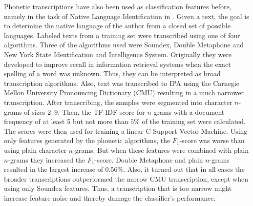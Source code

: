 Phonetic transcriptions have also been used as classification features before, namely in the task of Native Language Identification in \cite{smiley2017native}.
Given a text, the goal is to determine the native language of the author from a closed set of possible languages.
Labeled texts from a training set were transcribed using one of four algorithms.
Three of the algorithms used were Soundex, Double Metaphone and New York State Identification and Intelligence System.
Originally they were developed to improve recall in information retrieval systems when the exact spelling of a word was unknown.
Thus, they can be interpreted as broad transcription algorithms.
Also, text was transcribed to IPA using the Carnegie Mellon University Pronouncing Dictionary (CMU) resulting in a much narrower transcription.
After transcribing, the samples were segmented into character $n$-grams of sizes 2--9.
Then, the TF-IDF score for $n$-grams with a document frequency of at least 5 but not more than $5\%$ of the training set were calculated.
The scores were then used for training a linear C-Support Vector Machine.
Using only features generated by the phonetic algorithms, the $F_1$-score was worse than using plain character $n$-grams.
But when these features were combined with plain $n$-grams they increased the $F_1$-score.
Double Metaphone and plain $n$-grams resulted in the largest increase of $0.56\%$.
Also, it turned out that in all cases the broader transcriptions outperformed the narrow CMU transcription, except when using only Soundex features.
Thus, a transcription that is too narrow might increase feature noise and thereby damage the classifier's performance.